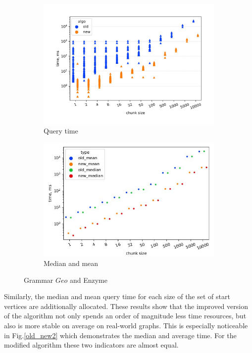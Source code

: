 \begin{figure}[h!]
\begin{subfigure}[b]{0.5\textwidth}
    \includegraphics[width=\columnwidth]{figures/bt_old_new.pdf_1.jpg}  \caption{Query time}
    \label{fig:subim1}
    \end{subfigure}%
    \begin{subfigure}[b]{0.5\textwidth}
    \centering
    \includegraphics[width=\textwidth]{figures/bt_old_new_mean&median.pdf_1.jpg} \caption{Median and mean}
    \label{fig:subim2}
    \end{subfigure} \caption{Grammar $Geo$ and Enzyme}
\label{old_new3}
\end{figure}

    Similarly, the median and mean query time for each size of the set of start vertices are additionally allocated. These results show that the improved version of the algorithm not only spends an order of magnitude less time resources, but also is more stable on average on real-world graphs. This is especially noticeable in Fig.\ref{old_new2} which demonstrates the median and average time. For the modified algorithm these two indicators are almost equal.
    
